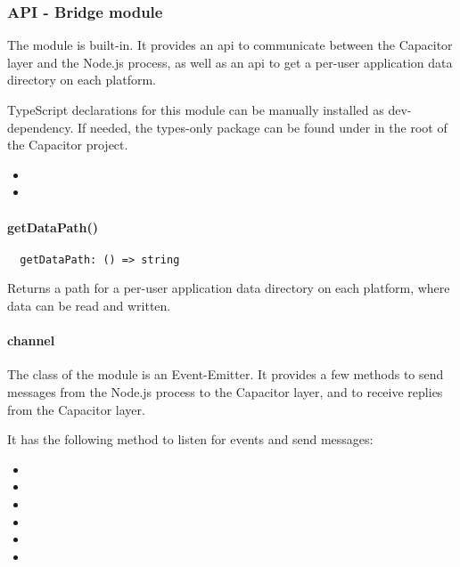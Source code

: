 \subsubsection{API - Bridge module}
\label{sec:Capacitor-NodeJS:API_BridgeModule}

The  module is built-in.
It provides an \ac{api} to communicate between the Capacitor layer and the Node.js process, as well as an \ac{api} to get a per-user application data directory on each platform.

TypeScript declarations for this  module can be manually installed as dev-dependency.
If needed, the types-only package can be found under  in the root of the Capacitor project.


\begin{itemize}
  \setlength\itemsep{-0.8em}
  \item {}
  \item {}
\end{itemize}


\paragraph{getDataPath()}

\begin{verbatim}
  getDataPath: () => string
\end{verbatim}

Returns a path for a per-user application data directory on each platform, where data can be read and written.


\paragraph{channel}

The  class of the  module is an Event-Emitter.
It provides a few methods to send messages from the Node.js process to the Capacitor layer, and to receive replies from the Capacitor layer.

It has the following method to listen for events and send messages:

\begin{itemize}
  \setlength\itemsep{-0.8em}
  \item {}
  \item {}
  \item {}
  \item {}
  \item {}
  \item {}
\end{itemize}

